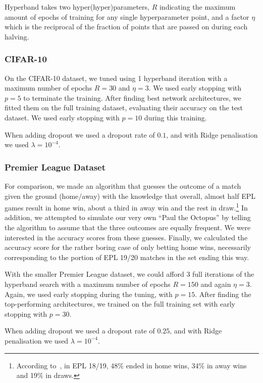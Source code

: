         Hyperband takes two hyper(hyper)parameters, $R$ indicating the maximum amount of epochs of training for any single hyperparameter point, and a factor $\eta$ which is the reciprocal of the fraction of points that are passed on during each halving.


    \subsubsection{CIFAR-10}
        On the CIFAR-10 dataset, we tuned using 1 hyperband iteration with a maximum number of epochs $R=30$ and $\eta=3$. We used early stopping with $p=5$ to terminate the training. After finding best network architectures, we fitted them on the full training dataset, evaluating their accuracy on the test dataset. We used early stopping with $p=10$ during this training.

        When adding dropout we used a dropout rate of $0.1$, and with Ridge penalisation we used $\lambda=10^{-4}$.

    \subsubsection{Premier League Dataset}
        For comparison, we made an algorithm that guesses the outcome of a match given the ground (home/away) with the knowledge that overall, almost half EPL games result in home win, about a third in away win and the rest in draw.\footnote{According to~\citep{SoccerSTATS}, in EPL 18/19, 48\% ended in home wins, 34\% in away wins and 19\% in draws.} In addition, we attempted to simulate our very own ``Paul the Octopus'' \citep{PaulTheOctopus} by telling the algorithm to assume that the three outcomes are equally frequent. We were interested in the accuracy scores from these guesses. Finally, we calculated the accuracy score for the rather boring case of only betting home wins, necessarily corresponding to the portion of EPL 19/20 matches in the set ending this way. 

        With the smaller Premier League dataset, we could afford 3 full iterations of the hyperband search with a maximum number of epochs $R=150$ and again $\eta=3$. Again, we used early stopping during the tuning, with $p=15$. After finding the top-performing architectures, we trained on the full training set with early stopping with $p=30$.

        When adding dropout we used a dropout rate of $0.25$, and with Ridge penalisation we used $\lambda=10^{-4}$.

